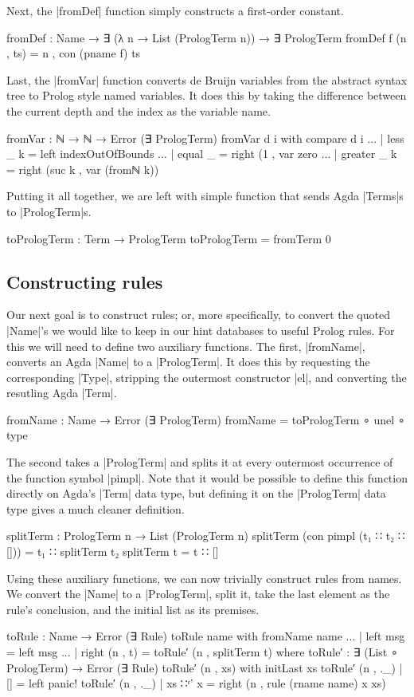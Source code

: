 \documentclass[preprint]{sigplanconf}
\begin{document}
Next, the |fromDef| function simply constructs a first-order constant.
\begin{code}
fromDef : Name → ∃ (λ n → List (PrologTerm n)) → ∃ PrologTerm
fromDef f (n , ts) = n , con (pname f) ts
\end{code}
Last, the |fromVar| function converts de Bruijn variables from the
abstract syntax tree to Prolog style named variables. It does this by
taking the difference between the current depth and the index as the
variable name.
\begin{code}
fromVar : ℕ → ℕ → Error (∃ PrologTerm)
fromVar d i with compare d i
... | less     _ k  = left indexOutOfBounds
... | equal    _    = right (1     , var zero
... | greater  _ k  = right (suc k , var (fromℕ k))
\end{code}
Putting it all together, we are left with simple function that sends
Agda |Terms|s to |PrologTerm|s.
\begin{code}
toPrologTerm : Term → PrologTerm
toPrologTerm = fromTerm 0
\end{code}



\subsection*{Constructing rules}

Our next goal is to construct rules; or, more specifically, to convert
the quoted |Name|'s we would like to keep in our hint databases to
useful Prolog rules.
For this we will need to define two auxiliary functions. The first,
|fromName|, converts an Agda |Name| to a |PrologTerm|. It does this by
requesting the corresponding |Type|, stripping the outermost
constructor |el|, and converting the resutling Agda |Term|.
\begin{code}
fromName : Name → Error (∃ PrologTerm)
fromName = toPrologTerm ∘ unel ∘ type
\end{code}
The second takes a |PrologTerm| and splits it at every outermost
occurrence of the function symbol |pimpl|. Note that it would be
possible to define this function directly on Agda's |Term| data type,
but defining it on the |PrologTerm| data type gives a much cleaner
definition.
\begin{code}
splitTerm : PrologTerm n → List (PrologTerm n)
splitTerm (con pimpl (t₁ ∷ t₂ ∷ [])) = t₁ ∷ splitTerm t₂
splitTerm t = t ∷ []
\end{code}
Using these auxiliary functions, we can now trivially construct rules
from names. We convert the |Name| to a |PrologTerm|, split it, take
the last element as the rule's conclusion, and the initial list as its
premises.
\begin{code}
toRule : Name → Error (∃ Rule)
toRule name with fromName name
... | left msg       = left msg
... | right (n , t)  = toRule′ (n , splitTerm t)
  where
    toRule′ : ∃ (List ∘ PrologTerm) → Error (∃ Rule)
    toRule′ (n , xs) with initLast xs
    toRule′ (n , ._)  | []        = left panic!
    toRule′ (n , ._)  | xs ∷ʳ' x  = right (n , rule (rname name) x xs)
\end{code}
\end{document}
